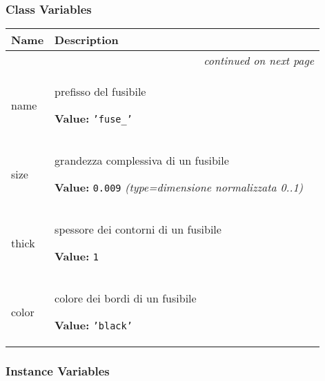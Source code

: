 
  \subsubsection{Class Variables}

    \vspace{-1cm}
\hspace{\varindent}\begin{longtable}{|p{\varnamewidth}|p{\vardescrwidth}|l}
\cline{1-2}
\cline{1-2} \centering \textbf{Name} & \centering \textbf{Description}& \\
\cline{1-2}
\endhead\cline{1-2}\multicolumn{3}{r}{\small\textit{continued on next page}}\\\endfoot\cline{1-2}
\endlastfoot\raggedright n\-a\-m\-e\- & \raggedright prefisso del fusibile

\textbf{Value:} 
{\tt \texttt{'}\texttt{fuse\_}\texttt{'}}&\\
\cline{1-2}
\raggedright s\-i\-z\-e\- & \raggedright grandezza complessiva di un fusibile

\textbf{Value:} 
{\tt 0.009}            {\it (type=dimensione normalizzata 0..1)}&\\
\cline{1-2}
\raggedright t\-h\-i\-c\-k\- & \raggedright spessore dei contorni di un fusibile

\textbf{Value:} 
{\tt 1}&\\
\cline{1-2}
\raggedright c\-o\-l\-o\-r\- & \raggedright colore dei bordi di un fusibile

\textbf{Value:} 
{\tt \texttt{'}\texttt{black}\texttt{'}}&\\
\cline{1-2}
\end{longtable}



  \subsubsection{Instance Variables}

